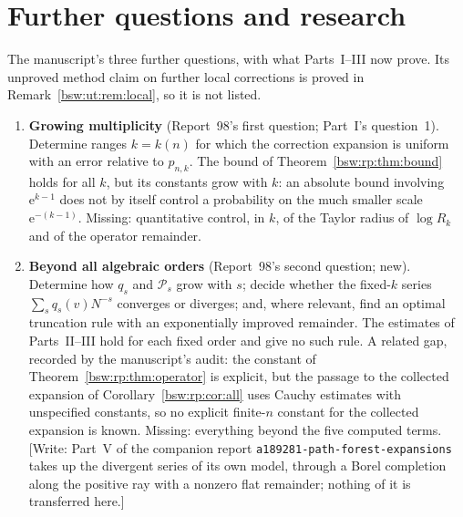 \documentclass[11pt,letterpaper]{article}
\theoremstyle{definition}
\theoremstyle{remark}
\newcommand{\ee}{\mathrm e}
\begin{document}
\section{Further questions and research}\label{bsw:ut:sec:questions}

The manuscript's three further questions, with what Parts~I--III now
prove.  Its unproved method claim on further local corrections is proved
in Remark~\ref{bsw:ut:rem:local}, so it is not listed.

\begin{enumerate}[leftmargin=2em]
\item\label{bsw:ut:q:growing} \textbf{Growing multiplicity} (Report~98's
first question; Part~I's question~1).  Determine ranges $k=k(n)$ for which
the correction expansion is uniform with an error relative to $p_{n,k}$.
The bound of Theorem~\ref{bsw:rp:thm:bound} holds for all $k$, but its
constants grow with $k$: an absolute bound involving $\ee^{k-1}$ does not
by itself control a probability on the much smaller scale $\ee^{-(k-1)}$.
Missing: quantitative control, in $k$, of the Taylor radius of $\log R_k$
and of the operator remainder.

\item\label{bsw:ut:q:beyond} \textbf{Beyond all algebraic orders}
(Report~98's second question; new).  Determine how $q_s$ and
$\mathcal P_s$ grow with $s$; decide whether the fixed-$k$ series
$\sum_sq_s(v)N^{-s}$ converges or diverges; and, where relevant, find an
optimal truncation rule with an exponentially improved remainder.  The
estimates of Parts~II--III hold for each fixed order and give no such rule.
A related gap, recorded by the manuscript's audit: the constant of
Theorem~\ref{bsw:rp:thm:operator} is explicit, but the passage to the
collected expansion of Corollary~\ref{bsw:rp:cor:all} uses Cauchy
estimates with unspecified constants, so no explicit finite-$n$ constant
for the collected expansion is known.  Missing: everything beyond the
five computed terms.  [Write: Part~V of the companion report
\texttt{a189281-\allowbreak path-\allowbreak forest-\allowbreak expansions}
takes up the divergent series of its own model, through a Borel completion
along the positive ray with a nonzero flat remainder; nothing of it is
transferred here.]


\end{enumerate}
\end{document}
